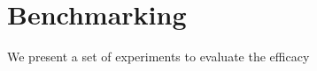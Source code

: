 \section{Benchmarking}
\label{sec:benchmarking}

We present a set of experiments to evaluate the efficacy 